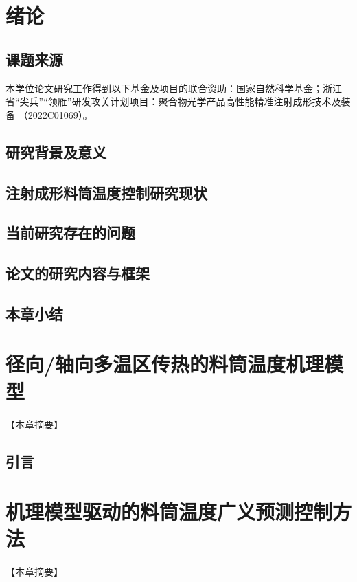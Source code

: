\chapter{绪论}

\section{课题来源}

本学位论文研究工作得到以下基金及项目的联合资助：国家自然科学基金；浙江省“尖兵”“领雁”研发攻关计划项目：聚合物光学产品高性能精准注射成形技术及装备 （2022C01069）。

\section{研究背景及意义}

\section{注射成形料筒温度控制研究现状}

\section{当前研究存在的问题}

\section{论文的研究内容与框架}

\section{本章小结}


\chapter{径向/轴向多温区传热的料筒温度机理模型}

【本章摘要】

\section{引言}


\chapter{机理模型驱动的料筒温度广义预测控制方法}

【本章摘要】

